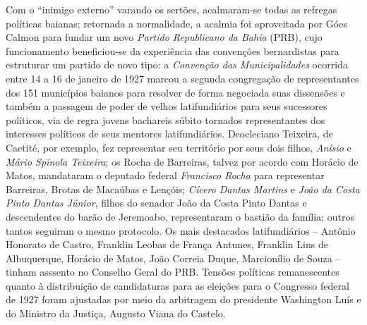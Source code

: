 Com o ``inimigo externo'' varando os sertões, acalmaram-se todas as refregas políticas baianas; retornada a normalidade, a acalmia foi aproveitada por Góes Calmon para fundar um novo \textit{Partido Republicano da Bahia} (PRB), cujo funcionamento beneficiou-se da experiência das convenções bernardistas para estruturar um partido de novo tipo: a \textit{Convenção das Municipalidades} ocorrida entre 14 a 16 de janeiro de 1927 marcou a segunda congregação de representantes dos 151 municípios baianos para resolver de forma negociada suas dissensões e também a passagem de poder de velhos latifundiários para seus sucessores políticos, via de regra jovens bachareis súbito tornados representantes dos interesses políticos de seus mentores latifundiários. Deocleciano Teixeira, de Caetité, por exemplo, fez representar seu território por seus dois filhos, \textit{Anísio} e \textit{Mário Spínola Teixeira}; os Rocha de Barreiras, talvez por acordo com Horácio de Matos, mandataram o deputado federal \textit{Francisco Rocha} para representar Barreiras, Brotas de Macaúbas e Lençóis; \textit{Cícero Dantas Martins} e \textit{João da Costa Pinto Dantas Júnior}, filhos do senador João da Costa Pinto Dantas e descendentes do barão de Jeremoabo, representaram o bastião da família; outros tantos seguiram o mesmo protocolo. Os mais destacados latifundiários -- Antônio Honorato de Castro, Franklin Leobas de França Antunes, Franklin Lins de Albuquerque, Horácio de Matos, João Correia Duque, Marcionílio de Souza -- tinham asssento no Conselho Geral do PRB. Tensões políticas remanescentes quanto à distribuição de candidaturas para as eleições para o Congresso federal de 1927 foram ajustadas por meio da arbitragem do presidente Washington Luís e do Ministro da Justiça, Augusto Viana do Castelo.

